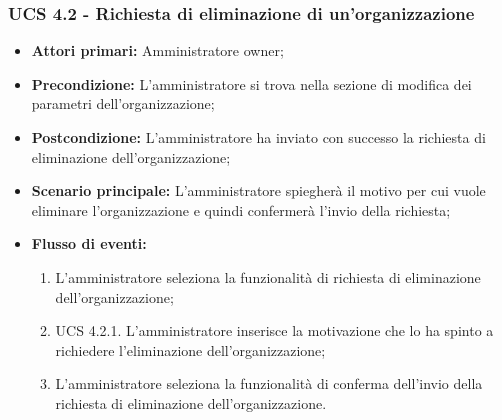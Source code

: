 \subsubsection{UCS 4.2 - Richiesta di eliminazione di un'organizzazione}%
\begin{itemize}
\item \textbf{Attori primari:} Amministratore owner;
\item \textbf{Precondizione:} L'amministratore si trova nella sezione di modifica dei parametri dell'organizzazione;
\item \textbf{Postcondizione:} L'amministratore ha inviato con successo la richiesta di eliminazione dell'organizzazione;
\item \textbf{Scenario principale:} L'amministratore spiegherà il motivo per cui vuole eliminare l'organizzazione e quindi confermerà l'invio della richiesta;
\item \textbf{Flusso di eventi:}
\begin{enumerate}
    \item L'amministratore seleziona la funzionalità di richiesta di eliminazione dell'organizzazione;
    \item UCS 4.2.1. L'amministratore inserisce la motivazione che lo ha spinto a richiedere l'eliminazione dell'organizzazione;
    \item L'amministratore seleziona la funzionalità di conferma dell'invio della richiesta di eliminazione dell'organizzazione.
\end{enumerate}
\end{itemize}